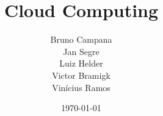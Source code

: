 \documentclass[a4paper, 12pt]{article}
\title{\textbf{Cloud Computing}}
\author{Bruno Campana\\Jan Segre\\Luiz Helder\\Victor Bramigk\\Vinícius Ramos}
\date{\today}
\begin{document}
\maketitle
 
\doublespacing




\end{document}
